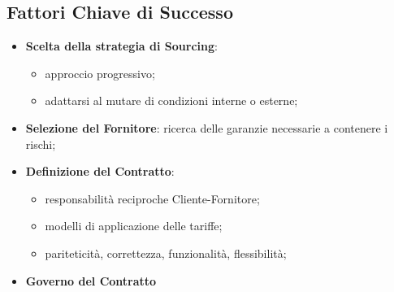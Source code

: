 \subsection{Fattori Chiave di Successo}\label{sub:cv_fattori_chiave_di_successo} %
\begin{itemize}
    \item \textbf{Scelta della strategia di Sourcing}:
        \begin{itemize}
            \item approccio progressivo;
            \item adattarsi al mutare di condizioni interne o esterne;
        \end{itemize}
    \item \textbf{Selezione del Fornitore}: ricerca delle garanzie necessarie a contenere i rischi;
    \item \textbf{Definizione del Contratto}:
        \begin{itemize}
            \item responsabilità reciproche Cliente-Fornitore;
            \item modelli di applicazione delle tariffe;
            \item pariteticità, correttezza, funzionalità, flessibilità;
        \end{itemize}
    \item \textbf{Governo del Contratto}
\end{itemize}
%
